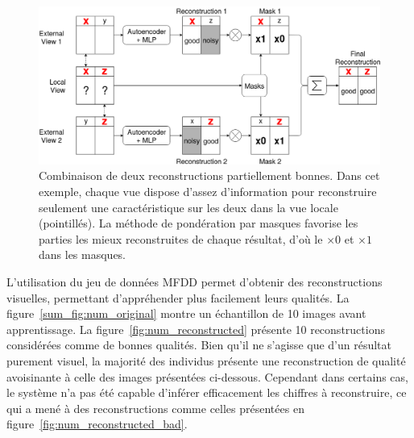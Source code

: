 \begin{figure}[H]
    \centering
    \includegraphics[scale=.3]{img/process_mwm.png}
    \caption{Combinaison de deux reconstructions partiellement bonnes. Dans cet exemple, chaque vue dispose d'assez d'information pour reconstruire seulement une caractéristique sur les deux dans la vue locale (pointillés). La méthode de pondération par masques favorise les parties les mieux reconstruites de chaque résultat, d'où le $\times 0$ et $\times 1$ dans les masques.}
\label{sum_fig:sum_process_mwm}
\end{figure}

L'utilisation du jeu de données MFDD permet d'obtenir des reconstructions visuelles, permettant d'appréhender plus facilement leurs qualités. La figure~\ref{sum_fig:num_original} montre un échantillon de 10 images avant apprentissage. La figure~\ref{fig:num_reconstructed} présente 10 reconstructions considérées comme de bonnes qualités. Bien qu'il ne s'agisse que d'un résultat purement visuel, la majorité des individus présente une reconstruction de qualité avoisinante à celle des images présentées ci-dessous. Cependant dans certains cas, le système n'a pas été capable d'inférer efficacement les chiffres à reconstruire, ce qui a mené à des reconstructions comme celles présentées en figure~\ref{fig:num_reconstructed_bad}.

